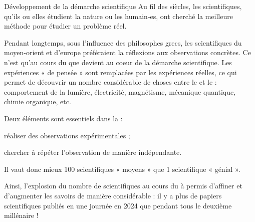 \begin{doc}{Développement de la démarche scientifique}
  Au fil des siècles, les scientifiques, qu'ils ou elles étudient la nature ou les humain-es, ont cherché la meilleure méthode pour étudier un problème réel.

  Pendant longtemps, sous l'influence des philosophes grecs, les scientifiques du moyen-orient et d'europe préféraient la réflexions aux observations concrètes.
  Ce n'est qu'au cours du  que  devient au coeur de la démarche scientifique.
  Les expériences « de pensée » sont remplacées par les expériences réelles, ce qui permet de découvrir un nombre considérable de choses entre le  et le  : comportement de la lumière, électricité, magnétisme, mécanique quantique, chimie organique, etc.
  \bigskip 

  Deux éléments sont essentiels dans la  : 
  \begin{listePoints}
    \item réaliser des observations expérimentales ;
    \item chercher à répéter l'observation de manière indépendante.
  \end{listePoints}
  Il vaut donc mieux 100 scientifiques « moyens » que 1 scientifique « génial ».

  Ainsi, l'explosion du nombre de scientifiques au cours du  à permis d'affiner et d'augmenter les savoirs de manière considérable : il y a plus de papiers scientifiques publiés en une journée en 2024 que pendant tous le deuxième millénaire !
\end{doc}


